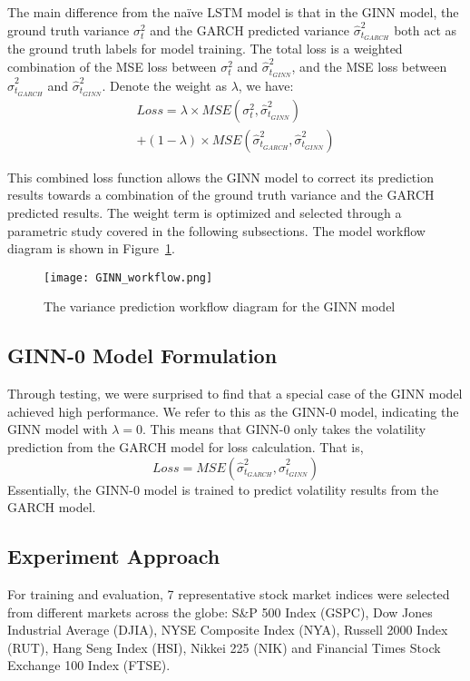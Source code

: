 The main difference from the naïve LSTM model is that in the GINN model, the ground truth variance $\sigma_t^2$ and the GARCH predicted variance $\hat{\sigma}_{t_{GARCH}}^2$ both act as the ground truth labels for model training. The total loss is a weighted combination of the MSE loss between $\sigma_t^2$ and $\hat{\sigma}_{t_{GINN}}^2$, and the MSE loss between $\hat{\sigma}_{t_{GARCH}}^2$ and $\hat{\sigma}_{t_{GINN}}^2$. Denote the weight as $\lambda$, we have: 
\begin{equation}
\begin{split}
    Loss = \lambda \times MSE \left( \sigma_t^2, \hat{\sigma}_{t_{GINN}}^2 \right) \\
    + ( 1 - \lambda) \times MSE \left( \hat{\sigma}_{t_{GARCH}}^2, \hat{\sigma}_{t_{GINN}}^2 \right)
\end{split}
\end{equation}

This combined loss function allows the GINN model to correct its prediction results towards a combination of the ground truth variance and the GARCH predicted results. The weight term is optimized and selected through a parametric study covered in the following subsections. The model workflow diagram is shown in Figure~\ref{GINNWF}.  

\begin{figure}[h]
  \centering
  \texttt{[image: GINN\_workflow.png]}
  \caption{The variance prediction workflow diagram for the GINN model}
  \label{GINNWF}
\end{figure}

\subsection{GINN-0 Model Formulation}
Through testing, we were surprised to find that a special case of the GINN model achieved high performance. We refer to this as the GINN-0 model, indicating the GINN model with $\lambda = 0$. This means that GINN-0 only takes the volatility prediction from the GARCH model for loss calculation. That is, 
\begin{equation}
    Loss = MSE \left( \hat{\sigma}_{t_{GARCH}}^2, \hat{\sigma}_{t_{GINN}}^2 \right)
\end{equation}
Essentially, the GINN-0 model is trained to predict volatility results from the GARCH model. 

\subsection{Experiment Approach}
For training and evaluation, 7 representative stock market indices were selected from different markets across the globe: S\&P 500 Index (GSPC), Dow Jones Industrial Average (DJIA), NYSE Composite Index (NYA), Russell 2000 Index (RUT), Hang Seng Index (HSI), Nikkei 225 (NIK) and Financial Times Stock Exchange 100 Index (FTSE). 

